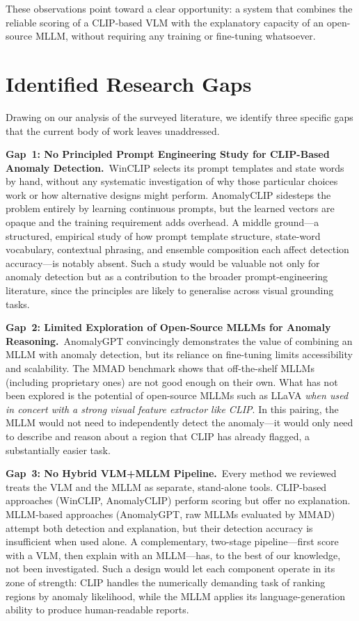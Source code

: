 \documentclass[conference]{IEEEtran}
\begin{document}
These observations point toward a clear opportunity: a system that combines the reliable scoring of a CLIP-based VLM with the explanatory capacity of an open-source MLLM, without requiring any training or fine-tuning whatsoever.

\section{Identified Research Gaps}

Drawing on our analysis of the surveyed literature, we identify three specific gaps that the current body of work leaves unaddressed.

\textbf{Gap~1: No Principled Prompt Engineering Study for CLIP-Based Anomaly Detection.}\
WinCLIP selects its prompt templates and state words by hand, without any systematic investigation of why those particular choices work or how alternative designs might perform. AnomalyCLIP sidesteps the problem entirely by learning continuous prompts, but the learned vectors are opaque and the training requirement adds overhead. A middle ground---a structured, empirical study of how prompt template structure, state-word vocabulary, contextual phrasing, and ensemble composition each affect detection accuracy---is notably absent. Such a study would be valuable not only for anomaly detection but as a contribution to the broader prompt-engineering literature, since the principles are likely to generalise across visual grounding tasks.

\textbf{Gap~2: Limited Exploration of Open-Source MLLMs for Anomaly Reasoning.}\
AnomalyGPT convincingly demonstrates the value of combining an MLLM with anomaly detection, but its reliance on fine-tuning limits accessibility and scalability. The MMAD benchmark shows that off-the-shelf MLLMs (including proprietary ones) are not good enough on their own. What has not been explored is the potential of open-source MLLMs such as LLaVA \textit{when used in concert with a strong visual feature extractor like CLIP}. In this pairing, the MLLM would not need to independently detect the anomaly---it would only need to describe and reason about a region that CLIP has already flagged, a substantially easier task.

\textbf{Gap~3: No Hybrid VLM+MLLM Pipeline.}\
Every method we reviewed treats the VLM and the MLLM as separate, stand-alone tools. CLIP-based approaches (WinCLIP, AnomalyCLIP) perform scoring but offer no explanation. MLLM-based approaches (AnomalyGPT, raw MLLMs evaluated by MMAD) attempt both detection and explanation, but their detection accuracy is insufficient when used alone. A complementary, two-stage pipeline---first score with a VLM, then explain with an MLLM---has, to the best of our knowledge, not been investigated. Such a design would let each component operate in its zone of strength: CLIP handles the numerically demanding task of ranking regions by anomaly likelihood, while the MLLM applies its language-generation ability to produce human-readable reports.
\end{document}
